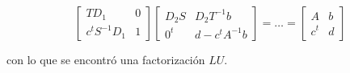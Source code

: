 \begin{itemize}
    \[
    \begin{bmatrix}
        TD_1 & 0 \\
        c^{t}S^{-1}D_1 & 1
    \end{bmatrix}
    \begin{bmatrix}
        D_2 S & D_2 T^{-1}b \\
        0^{t} & d - c^{t}A^{-1}b
    \end{bmatrix}
    = \ldots =
    \begin{bmatrix}
        A & b \\
        c^{t} & d
    \end{bmatrix}
    \]
    
    con lo que se encontró una factorización $LU$.
    
\end{itemize}
